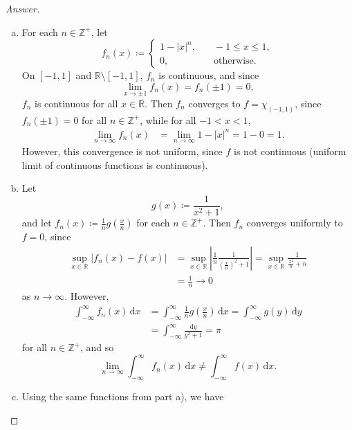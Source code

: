 \documentclass[12pt]{article}
\newcommand{\z}{\mathbb{Z}}
\newcommand{\real}{\mathbb{R}}
\newcommand\paren[1]{\left( #1 \right)}
\newcommand{\abs}[1]{\left | #1 \right |}
\theoremstyle{definition}
\begin{document}
\begin{proof}[Answer]
    \noindent 
    \begin{enumerate}[a)]
        \item For each $n \in \z^+$, let 
        \[
            f_n(x) \coloneqq 
            \begin{cases}
                1 - |x|^n , & \quad -1 \leq x \leq 1 , \\
                0 , & \quad \text{otherwise}.
            \end{cases}
        \]
        On $[-1,1]$ and $\real \setminus [-1,1]$, $f_n$ is continuous, and since
        \[
            \lim\limits_{x \to \pm 1} f_n(x) = f_n(\pm1) = 0,
        \]
        $f_n$ is continuous for all $x \in \real$.
        Then $f_n$ converges to $f = \chi_{(-1,1)}$, since $f_n(\pm1) = 0$ for all $n \in \z^+$, while for all $-1 < x < 1$, 
        \begin{align*}
            \lim\limits_{n \to \infty} f_n(x) & = \lim\limits_{n \to \infty} 1 - |x|^n = 1 - 0 = 1.
        \end{align*}
        However, this convergence is not uniform, since $f$ is not continuous (uniform limit of continuous functions is continuous).
        \item Let
        \[
            g(x) \coloneqq \frac{1}{x^2+1},
        \]
        and let $f_n(x) \coloneqq \frac{1}{n} g \paren{  \frac{x}{n} }$ for each $n \in \z^+$. Then $f_n$ converges uniformly to $f = 0$, since
        \begin{align*}
            \sup\limits_{x \in \real} \abs{ f_n(x) - f(x) } & = \sup\limits_{x \in \real} \abs{ \frac{1}{n} \frac{1}{\paren{ \frac{x}{n} }^2+1} }  = \sup\limits_{x \in \real} \frac{1}{\frac{x^2}{n}+n} \\
            & = \frac{1}{n} \to 0
        \end{align*}
        as $n \to \infty$. However,
        \begin{align*}
            \int_{-\infty}^{\infty} f_n(x) \, \mathrm{d}x & = \int_{-\infty}^{\infty} \frac{1}{n} g \paren{  \frac{x}{n} } \, \mathrm{d}x = \int_{-\infty}^{\infty} g(y) \, \mathrm{d}y \\
            & = \int_{-\infty}^{\infty} \frac{\mathrm{d}y}{y^2+1} = \pi
        \end{align*}
        for all $n \in \z^+$, and so 
        \[
            \lim\limits_{n \to \infty} \int_{-\infty}^{\infty} f_n(x) \, \mathrm{d}x \neq \int_{-\infty}^{\infty} f(x) \, \mathrm{d}x.
        \]
        \item Using the same functions from part a), we have 

\end{enumerate}
\end{proof}
\end{document}
